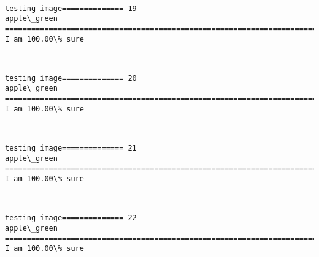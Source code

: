 \documentclass[11pt]{article}
\begin{document}
    \begin{center}
    \end{center}
    { \hspace*{\fill} \\}
    
    \begin{Verbatim}[commandchars=\\\{\}]
testing image============== 19
apple\_green
============================================================================
I am 100.00\% sure

    \end{Verbatim}

    \begin{center}
    \end{center}
    { \hspace*{\fill} \\}
    
    \begin{Verbatim}[commandchars=\\\{\}]
testing image============== 20
apple\_green
============================================================================
I am 100.00\% sure

    \end{Verbatim}

    \begin{center}
    \end{center}
    { \hspace*{\fill} \\}
    
    \begin{Verbatim}[commandchars=\\\{\}]
testing image============== 21
apple\_green
============================================================================
I am 100.00\% sure

    \end{Verbatim}

    \begin{center}
    \end{center}
    { \hspace*{\fill} \\}
    
    \begin{Verbatim}[commandchars=\\\{\}]
testing image============== 22
apple\_green
============================================================================
I am 100.00\% sure

    \end{Verbatim}
\end{document}
